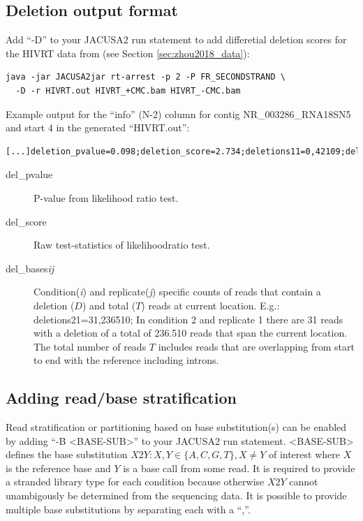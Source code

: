 \documentclass[10pt,a4paper,final]{article}
\begin{document}
\subsection{Deletion output format}
Add ``-D'' to your JACUSA2 run statement to add differetial deletion scores for the HIVRT data from 
\cite{Zhou2018} (see Section \ref{sec:zhou2018_data}):
\begin{verbatim}
java -jar JACUSA2jar rt-arrest -p 2 -P FR_SECONDSTRAND \
  -D -r HIVRT.out HIVRT_+CMC.bam HIVRT_-CMC.bam
\end{verbatim}
Example output for the ``info'' (N-2) column for contig NR\_003286\_RNA18SN5 and start 4 in the 
generated ``HIVRT.out'':
\begin{verbatim}
[...]deletion_pvalue=0.098;deletion_score=2.734;deletions11=0,42109;deletions21=8,89123[...]
\end{verbatim}
\begin{description}
  \item[del\_pvalue] P-value from likelihood ratio test.
  \item[del\_score] Raw test-statistics of likelihoodratio test.
  \item[del\_bases\textit{ij}] Condition(\textit{i}) and replicate(\textit{j}) specific counts 
  of reads that contain a deletion ($D$) and total ($T$) reads at current location. E.g.: deletions21=31,236510;
  In condition 2 and replicate 1 there are 31 reads with a deletion of a total of 236.510 reads 
  that span the current location. The total number of reads $T$ includes reads that are overlapping 
  from start to end with the reference including introns.
\end{description}
\subsection{Adding read/base stratification}\label{sec:read_tagging}
Read stratification or partitioning based on base substitution(s) can be enabled by adding ``-B <BASE-SUB>'' 
to your JACUSA2 run statement. <BASE-SUB> defines the base substitution $X2Y : X,Y \in\{A, C, G, T\}, X \ne Y$ 
of interest where $X$ is the reference base and $Y$ is a base call from some read. It is required to provide 
a stranded library type for each condition because otherwise $X2Y$ cannot unambigously be determined from the 
sequencing data. It is possible to provide multiple base substitutions by separating each with a ``,''.
\end{document}
